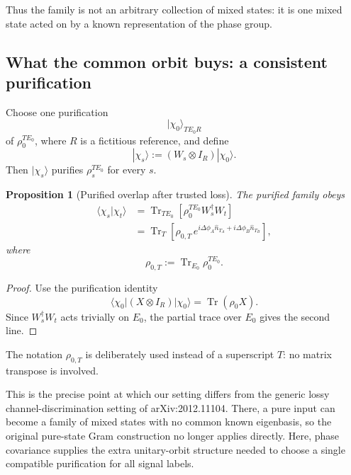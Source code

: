\documentclass[11pt]{article}
\newtheorem{proposition}{Proposition}
\theoremstyle{remark}
\begin{document}
Thus the family is not an arbitrary collection of mixed states: it is one
mixed state acted on by a known representation of the phase group.

\subsection{What the common orbit buys: a consistent purification}

Choose one purification
\[
    |\chi_0\rangle_{TE_0R}
\]
of \(\rho_0^{TE_0}\), where \(R\) is a fictitious reference, and define
\begin{equation}
    |\chi_s\rangle
    :=
    (W_s\otimes I_R)|\chi_0\rangle.
    \label{eq:stage2-common-purification}
\end{equation}
Then \(|\chi_s\rangle\) purifies \(\rho_s^{TE_0}\) for every \(s\).

\begin{proposition}[Purified overlap after trusted loss]
The purified family obeys
\begin{align}
    \langle\chi_s|\chi_t\rangle
    &=
    \operatorname{Tr}_{TE_0}
    \left[
      \rho_0^{TE_0}W_s^\dagger W_t
    \right]
    \nonumber\\
    &=
    \operatorname{Tr}_{T}
    \left[
      \rho_{0,T}\,
      e^{i\Delta\phi_A\hat n_{T_A}
        +i\Delta\phi_B\hat n_{T_B}}
    \right],
    \label{eq:stage2-purified-overlap}
\end{align}
where
\[
    \rho_{0,T}
    :=
    \operatorname{Tr}_{E_0}\rho_0^{TE_0}.
\]
\end{proposition}

\begin{proof}
Use the purification identity
\[
    \langle\chi_0|(X\otimes I_R)|\chi_0\rangle
    =
    \operatorname{Tr}(\rho_0X).
\]
Since \(W_s^\dagger W_t\) acts trivially on \(E_0\), the partial trace over
\(E_0\) gives the second line.
\end{proof}

The notation \(\rho_{0,T}\) is deliberately used instead of a superscript
\(T\): no matrix transpose is involved.

This is the precise point at which our setting differs from the generic lossy
channel-discrimination setting of arXiv:2012.11104.  There, a pure input can
become a family of mixed states with no common known eigenbasis, so the
original pure-state Gram construction no longer applies directly.  Here,
phase covariance supplies the extra unitary-orbit structure needed to choose a
single compatible purification for all signal labels.
\end{document}
